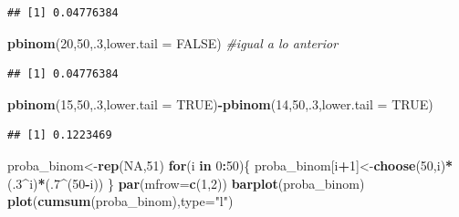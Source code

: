 \documentclass[
]{article}
\newenvironment{Shaded}{\begin{snugshade}}{\end{snugshade}}
\newcommand{\AttributeTok}[1]{\textcolor[rgb]{0.13,0.29,0.53}{#1}}
\newcommand{\CommentTok}[1]{\textcolor[rgb]{0.56,0.35,0.01}{\textit{#1}}}
\newcommand{\ConstantTok}[1]{\textcolor[rgb]{0.56,0.35,0.01}{#1}}
\newcommand{\ControlFlowTok}[1]{\textcolor[rgb]{0.13,0.29,0.53}{\textbf{#1}}}
\newcommand{\DecValTok}[1]{\textcolor[rgb]{0.00,0.00,0.81}{#1}}
\newcommand{\FunctionTok}[1]{\textcolor[rgb]{0.13,0.29,0.53}{\textbf{#1}}}
\newcommand{\NormalTok}[1]{#1}
\newcommand{\OtherTok}[1]{\textcolor[rgb]{0.56,0.35,0.01}{#1}}
\newcommand{\SpecialCharTok}[1]{\textcolor[rgb]{0.81,0.36,0.00}{\textbf{#1}}}
\newcommand{\StringTok}[1]{\textcolor[rgb]{0.31,0.60,0.02}{#1}}
\begin{document}
\begin{verbatim}
## [1] 0.04776384
\end{verbatim}

\begin{Shaded}
\begin{Highlighting}[]
\FunctionTok{pbinom}\NormalTok{(}\DecValTok{20}\NormalTok{,}\DecValTok{50}\NormalTok{,.}\DecValTok{3}\NormalTok{,}\AttributeTok{lower.tail =} \ConstantTok{FALSE}\NormalTok{) }\CommentTok{\#igual a lo anterior}
\end{Highlighting}
\end{Shaded}

\begin{verbatim}
## [1] 0.04776384
\end{verbatim}

\begin{Shaded}
\begin{Highlighting}[]
\FunctionTok{pbinom}\NormalTok{(}\DecValTok{15}\NormalTok{,}\DecValTok{50}\NormalTok{,.}\DecValTok{3}\NormalTok{,}\AttributeTok{lower.tail =} \ConstantTok{TRUE}\NormalTok{)}\SpecialCharTok{{-}}\FunctionTok{pbinom}\NormalTok{(}\DecValTok{14}\NormalTok{,}\DecValTok{50}\NormalTok{,.}\DecValTok{3}\NormalTok{,}\AttributeTok{lower.tail =} \ConstantTok{TRUE}\NormalTok{)}
\end{Highlighting}
\end{Shaded}

\begin{verbatim}
## [1] 0.1223469
\end{verbatim}

\begin{Shaded}
\begin{Highlighting}[]
\NormalTok{proba\_binom}\OtherTok{\textless{}{-}}\FunctionTok{rep}\NormalTok{(}\ConstantTok{NA}\NormalTok{,}\DecValTok{51}\NormalTok{)}
\ControlFlowTok{for}\NormalTok{(i }\ControlFlowTok{in} \DecValTok{0}\SpecialCharTok{:}\DecValTok{50}\NormalTok{)\{}
\NormalTok{proba\_binom[i}\SpecialCharTok{+}\DecValTok{1}\NormalTok{]}\OtherTok{\textless{}{-}}\FunctionTok{choose}\NormalTok{(}\DecValTok{50}\NormalTok{,i)}\SpecialCharTok{*}\NormalTok{(.}\DecValTok{3}\SpecialCharTok{\^{}}\NormalTok{i)}\SpecialCharTok{*}\NormalTok{(.}\DecValTok{7}\SpecialCharTok{\^{}}\NormalTok{(}\DecValTok{50}\SpecialCharTok{{-}}\NormalTok{i)) \}}
\FunctionTok{par}\NormalTok{(}\AttributeTok{mfrow=}\FunctionTok{c}\NormalTok{(}\DecValTok{1}\NormalTok{,}\DecValTok{2}\NormalTok{))}
\FunctionTok{barplot}\NormalTok{(proba\_binom)}
\FunctionTok{plot}\NormalTok{(}\FunctionTok{cumsum}\NormalTok{(proba\_binom),}\AttributeTok{type=}\StringTok{"l"}\NormalTok{)}
\end{Highlighting}
\end{Shaded}
\end{document}
